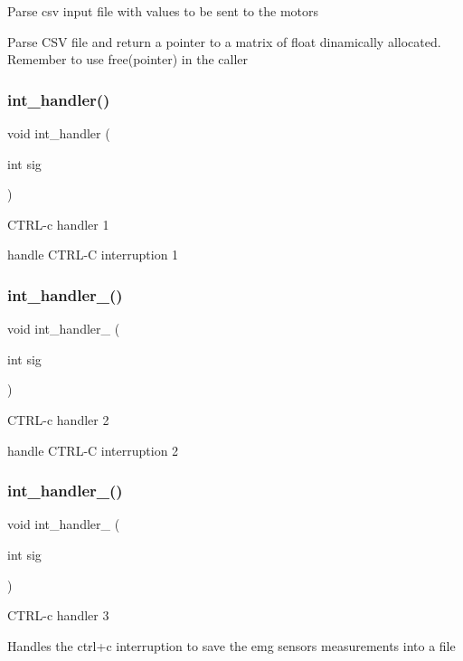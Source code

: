 Parse csv input file with values to be sent to the motors

Parse C\+SV file and return a pointer to a matrix of float dinamically allocated. Remember to use free(pointer) in the caller \mbox{\label{qbadmin_8c_aa2bbc30ab4adea656f93d184270b0463}} 
\subsubsection{int\+\_\+handler()}
{\footnotesize\ttfamily void int\+\_\+handler (\begin{DoxyParamCaption}\item[{int}]{sig }\end{DoxyParamCaption})}

C\+T\+R\+L-\/c handler 1

handle C\+T\+R\+L-\/C interruption 1 \mbox{\label{qbadmin_8c_aaa3f1dc84f95d8979c957bb2d9c6df18}} 
\subsubsection{int\+\_\+handler\+\_()}
{\footnotesize\ttfamily void int\+\_\+handler\+\_ (\begin{DoxyParamCaption}\item[{int}]{sig }\end{DoxyParamCaption})}

C\+T\+R\+L-\/c handler 2

handle C\+T\+R\+L-\/C interruption 2 \mbox{\label{qbadmin_8c_affb492a4714b7e7b8047971581fd9aab}} 
\subsubsection{int\+\_\+handler\+\_()}
{\footnotesize\ttfamily void int\+\_\+handler\+\_ (\begin{DoxyParamCaption}\item[{int}]{sig }\end{DoxyParamCaption})}

C\+T\+R\+L-\/c handler 3

Handles the ctrl+c interruption to save the emg sensors measurements into a file \mbox{\label{qbadmin_8c_a3c04138a5bfe5d72780bb7e82a18e627}} 
